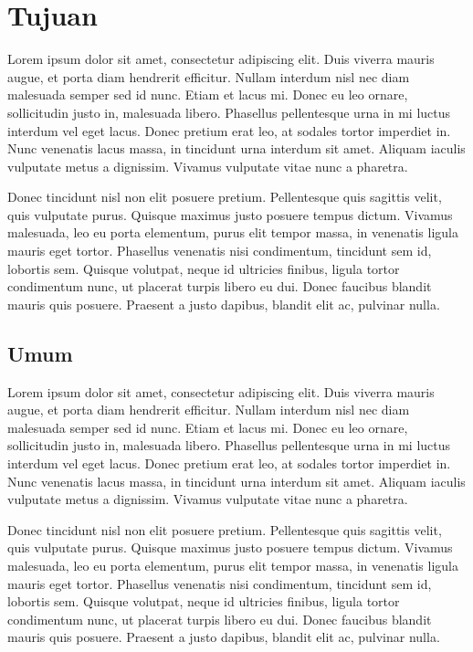 \section{Tujuan}
Lorem ipsum dolor sit amet, consectetur adipiscing elit. Duis viverra mauris augue, et porta diam hendrerit efficitur. Nullam interdum nisl nec diam malesuada semper sed id nunc. Etiam et lacus mi. Donec eu leo ornare, sollicitudin justo in, malesuada libero. Phasellus pellentesque urna in mi luctus interdum vel eget lacus. Donec pretium erat leo, at sodales tortor imperdiet in. Nunc venenatis lacus massa, in tincidunt urna interdum sit amet. Aliquam iaculis vulputate metus a dignissim. Vivamus vulputate vitae nunc a pharetra.

Donec tincidunt nisl non elit posuere pretium. Pellentesque quis sagittis velit, quis vulputate purus. Quisque maximus justo posuere tempus dictum. Vivamus malesuada, leo eu porta elementum, purus elit tempor massa, in venenatis ligula mauris eget tortor. Phasellus venenatis nisi condimentum, tincidunt sem id, lobortis sem. Quisque volutpat, neque id ultricies finibus, ligula tortor condimentum nunc, ut placerat turpis libero eu dui. Donec faucibus blandit mauris quis posuere. Praesent a justo dapibus, blandit elit ac, pulvinar nulla. 


\subsection{Umum}
Lorem ipsum dolor sit amet, consectetur adipiscing elit. Duis viverra mauris augue, et porta diam hendrerit efficitur. Nullam interdum nisl nec diam malesuada semper sed id nunc. Etiam et lacus mi. Donec eu leo ornare, sollicitudin justo in, malesuada libero. Phasellus pellentesque urna in mi luctus interdum vel eget lacus. Donec pretium erat leo, at sodales tortor imperdiet in. Nunc venenatis lacus massa, in tincidunt urna interdum sit amet. Aliquam iaculis vulputate metus a dignissim. Vivamus vulputate vitae nunc a pharetra.

Donec tincidunt nisl non elit posuere pretium. Pellentesque quis sagittis velit, quis vulputate purus. Quisque maximus justo posuere tempus dictum. Vivamus malesuada, leo eu porta elementum, purus elit tempor massa, in venenatis ligula mauris eget tortor. Phasellus venenatis nisi condimentum, tincidunt sem id, lobortis sem. Quisque volutpat, neque id ultricies finibus, ligula tortor condimentum nunc, ut placerat turpis libero eu dui. Donec faucibus blandit mauris quis posuere. Praesent a justo dapibus, blandit elit ac, pulvinar nulla. 



